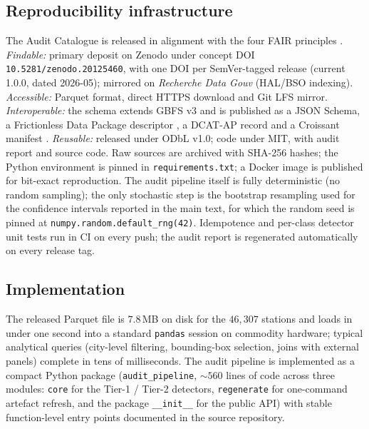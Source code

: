 \documentclass[11pt,a4paper]{article}
\begin{document}
\subsection{Reproducibility infrastructure}
The Audit Catalogue is released in alignment with the four FAIR
principles \cite{Wilkinson2016}. \emph{Findable:} primary deposit on
Zenodo under concept DOI \texttt{10.5281/zenodo.20125460}, with one
DOI per SemVer-tagged release (current 1.0.0, dated 2026-05); mirrored
on \emph{Recherche Data Gouv} (HAL/BSO indexing). \emph{Accessible:}
Parquet format, direct HTTPS download and Git LFS mirror.
\emph{Interoperable:} the schema extends GBFS v3 and is published as a
JSON Schema, a Frictionless Data Package descriptor
\cite{FrictionlessData2023}, a DCAT-AP record \cite{DCATAP2021} and a
Croissant manifest \cite{Croissant2024}. \emph{Reusable:} released
under ODbL v1.0; code under MIT, with audit report and source code.
Raw sources are archived with SHA-256 hashes; the Python
environment is pinned in \texttt{requirements.txt}; a Docker image
is published for bit-exact reproduction. The audit pipeline itself
is fully deterministic (no random sampling); the only stochastic
step is the bootstrap resampling used for the confidence intervals
reported in the main text, for which the random seed is pinned at
\texttt{numpy.random.default\_rng(42)}. Idempotence and per-class
detector unit tests run in CI on every push; the audit report is
regenerated automatically on every release tag.

\subsection{Implementation}
The released Parquet file is $7.8$\,MB on disk for the
$46{,}307$ stations and loads in under one second into a
standard \texttt{pandas} session on commodity hardware; typical
analytical queries (city-level filtering, bounding-box selection,
joins with external panels) complete in tens of milliseconds.
The audit pipeline is implemented as a compact Python package
(\texttt{audit\_pipeline}, $\sim 560$ lines of code across three
modules: \texttt{core} for the Tier-1 / Tier-2 detectors,
\texttt{regenerate} for one-command artefact refresh, and the
package \texttt{\_\_init\_\_} for the public API) with stable
function-level entry points documented in the source repository.
\end{document}

